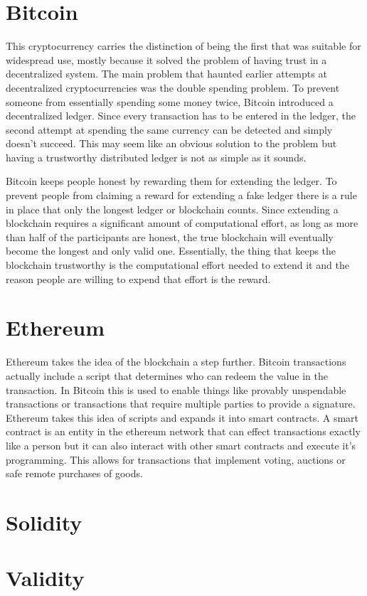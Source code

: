 \section{Bitcoin}

This cryptocurrency carries the distinction of being the first that was
suitable for widespread use, mostly because it solved the problem of having
trust in a decentralized system.
The main problem that haunted earlier attempts at decentralized
cryptocurrencies was the double spending problem.
To prevent someone from essentially spending some money twice, Bitcoin
introduced a decentralized ledger.
Since every transaction has to be entered in the ledger, the second attempt at
spending the same currency can be detected and simply doesn't succeed.
This may seem like an obvious solution to the problem but having a trustworthy
distributed ledger is not as simple as it sounds.

Bitcoin keeps people honest by rewarding them for extending the ledger.
To prevent people from claiming a reward for extending a fake ledger there is a
rule in place that only the longest ledger or blockchain counts.
Since extending a blockchain requires a significant amount of computational
effort, as long as more than half of the participants are honest, the true
blockchain will eventually become the longest and only valid one.
Essentially, the thing that keeps the blockchain trustworthy is the
computational effort needed to extend it and the reason people are willing to
expend that effort is the reward.

\section{Ethereum}

Ethereum takes the idea of the blockchain a step further.
Bitcoin transactions actually include a script that determines who can redeem
the value in the transaction.
In Bitcoin this is used to enable things like provably unspendable transactions
or transactions that require multiple parties to provide a signature.
Ethereum takes this idea of scripts and expands it into smart contracts.
A smart contract is an entity in the ethereum network that can effect
transactions exactly like a person but it can also interact with other smart
contracts and execute it's programming.
This allows for transactions that implement voting, auctions or safe remote
purchases of goods.


\section{Solidity}

\section{Validity}
